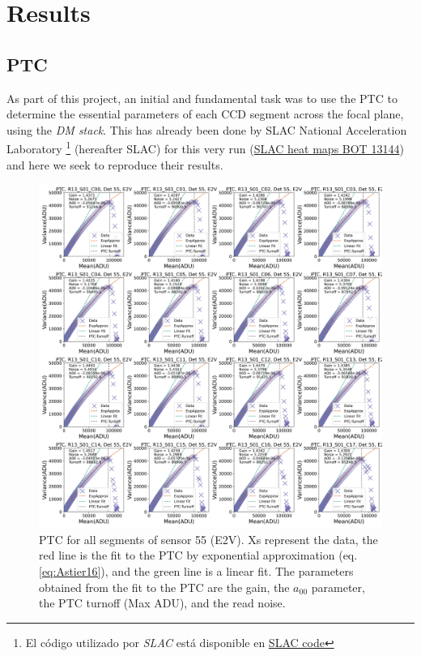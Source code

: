 \section{Results} \label{sec:results}


\subsection{PTC}

As part of this project, an initial and fundamental task was to use the PTC to determine the essential parameters of each CCD segment across the focal plane, using the \textit{DM stack}. This has already been done by SLAC National Acceleration Laboratory \footnote{El código utilizado por \textit{SLAC} está disponible en \href{https://github.com/lsst-camera-dh/eotest/blob/32c17b0a33b9c099651ed581ee90c1b1101012fb/python/lsst/eotest/sensor/ptcTask.py}{SLAC code}} (hereafter SLAC) for this very run (\href{https://srs.slac.stanford.edu/BOT_EO_Reports/13144/}{SLAC heat maps BOT 13144}) and here we seek to reproduce their results.



\vspace{3mm}


\begin{figure}[!htb]
    \centering
    \includegraphics[width=\textwidth]{Figures/PTC_Detector55.png}
    \caption{PTC for all segments of sensor 55 (E2V). Xs represent the data, the red line is the fit to the PTC by exponential approximation (eq. \ref{eq:Astier16}), and the green line is a linear fit. The parameters obtained from the fit to the PTC are the gain, the $a_{00}$ parameter, the PTC turnoff (Max ADU), and the read noise. }
    \label{fig:PTC_55}
\end{figure}

